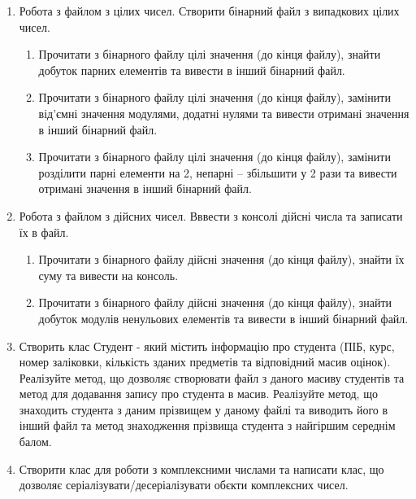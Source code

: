 \documentclass[]{article}
\makeatletter
\newcommand{\xslalph}[1]{\expandafter\@xslalph\csname c@#1\endcsname}
\newcommand{\@xslalph}[1]{%
    \ifcase#1\or а\or б\or в\or г\or д\or e\or є\or ж\or з\or i%
    \or й\or к\or л\or м\or н\or о\or п\or р\or с\or т%
    \or у\or ф\or х\or ц\or ч\or ш\or ю\or я\or аа\or бб\or вв %
    \else\@ctrerr\fi%
}
\makeatother
\begin{document}
\begin{enumerate}
\def\labelenumi{\arabic{enumi}.}
\item  Робота з файлом з цілих чисел. Створити бінарний файл з випадкових цілих чисел.
\begin{enumerate}[label=\xslalph*)]
\item   Прочитати з бінарного файлу цілі значення (до кінця файлу), знайти добуток парних елементів та вивести в інший бінарний файл. 
\item   Прочитати з бінарного файлу цілі значення (до кінця файлу), замінити від'ємні значення модулями, додатні нулями та вивести отримані значення в інший бінарний файл. 
\item   Прочитати з бінарного файлу цілі значення (до кінця файлу), замінити розділити парні елементи на 2, непарні – збільшити у 2 рази та вивести отримані значення в інший бінарний файл.
 \end{enumerate}


\item  Робота з файлом з дійсних чисел. Вввести з консолі дійсні числа та записати їх в файл.
\begin{enumerate}[label=\xslalph*)]
\item
  Прочитати з бінарного файлу дійсні значення (до кінця файлу), знайти їх суму та вивести на консоль. 
\item   Прочитати з бінарного файлу дійсні значення (до кінця файлу), знайти добуток модулів ненульових елементів та вивести в інший бінарний файл. 
 \end{enumerate}

\item

Створить клас Студент - який містить інформацію про студента (ПІБ, курс, номер заліковки, кількість зданих предметів та
відповідний масив оцінок). Реалізуйте метод, що дозволяє створювати файл з даного масиву студентів та метод для
додавання запису про студента в масив.
Реалізуйте метод, що знаходить студента з даним прізвищем у даному файлі та виводить його в інший файл та метод 
знаходження прізвища студента з найгіршим середнім балом.  
 
\item
Створити клас для роботи з комплексними числами та написати клас, що дозволяє серіалізувати/десеріалізувати обєкти комплексних чисел.

\end{enumerate}
\end{document}
